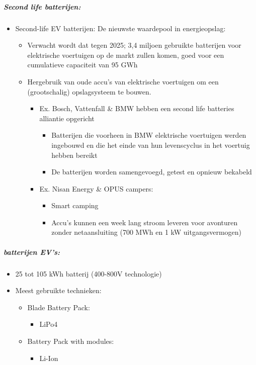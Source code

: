\documentclass[12pt]{article}
\begin{document}
\subparagraph{Second life batterijen:}\begin{itemize}
    \item Second-life EV batterijen: De nieuwste waardepool in energieopslag:\begin{itemize}
        \item Verwacht wordt dat tegen 2025; 3,4 miljoen gebruikte batterijen voor elektrische voertuigen op de markt zullen komen, goed voor een cumulatieve capaciteit van 95 GWh
        \item Hergebruik van oude accu's van elektrische voertuigen om een (grootschalig) opslagsysteem te bouwen.\begin{itemize}
            \item Ex. Bosch, Vattenfall \& BMW hebben een second life batteries alliantie opgericht\begin{itemize}
                \item Batterijen die voorheen in BMW elektrische voertuigen werden ingebouwd en die het einde van hun levenscyclus in het voertuig hebben bereikt
                \item De batterijen worden samengevoegd, getest en opnieuw bekabeld
            \end{itemize}
            \item Ex. Nisan Energy \& OPUS campers:\begin{itemize}
                \item Smart camping
                \item Accu's kunnen een week lang stroom leveren voor avonturen
                zonder netaansluiting (700 MWh en 1 kW uitgangsvermogen)
            \end{itemize}
        \end{itemize}
    \end{itemize} 
\end{itemize}
\subparagraph{batterijen EV's:}
\begin{itemize}
    \item 25 tot 105 kWh batterij (400-800V technologie)
    \item Meest gebruikte technieken:\begin{itemize}
        \item Blade Battery Pack:\begin{itemize}
            \item LiPo4
        \end{itemize}
        \item Battery Pack with modules:\begin{itemize}
            \item Li-Ion
        \end{itemize}
    \end{itemize}
\end{itemize}
\end{document}
